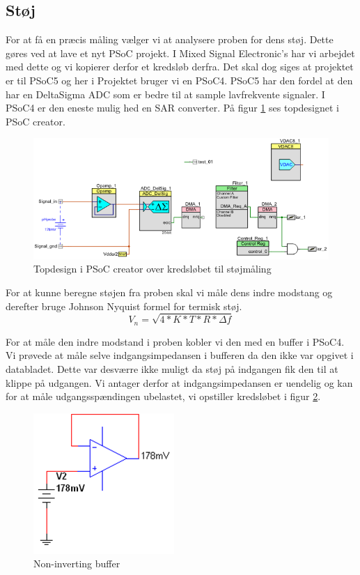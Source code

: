  

\subsection{Støj}

For at få en præcis måling vælger vi at analysere proben for dens støj. Dette gøres ved at lave et nyt PSoC projekt. I Mixed Signal Electronic's har vi arbejdet med dette og vi kopierer derfor et kredsløb derfra. Det skal dog siges at projektet er til PSoC5 og her i Projektet bruger vi en PSoC4. PSoC5 har den fordel at den har en DeltaSigma ADC som er bedre til at sample lavfrekvente signaler. I PSoC4 er den eneste mulig hed en SAR converter. På figur \ref{photo:Topdesign_stoj} ses topdesignet i PSoC creator. 
 \begin{figure}[H]
	\centering 
	\includegraphics[scale=0.8]{HardwareArkitektur/Sensore/pH_probe_billeder/Topdesign_stoj.png}
	\caption{Topdesign i PSoC creator over kredsløbet til støjmåling}
	\label{photo:Topdesign_stoj}
\end{figure} 

For at kunne beregne støjen fra proben skal vi måle dens indre modstang og derefter bruge Johnson Nyquist formel for termisk støj. 
$$ V_n = \sqrt{4*K*T*R*\Delta f} $$

For at måle den indre modstand i proben kobler vi den med en buffer i PSoC4. Vi prøvede at måle selve indgangsimpedansen i bufferen da den ikke var opgivet i databladet. Dette var desværre ikke muligt da støj på indgangen fik den til at klippe på udgangen. Vi antager derfor at indgangsimpedansen er uendelig og kan for at måle udgangsspændingen ubelastet, vi opstiller kredsløbet i figur \ref{photo:Non_inv_buf}. 

 \begin{figure}[H]
	\centering 
	\includegraphics[scale=1]{HardwareArkitektur/Sensore/pH_probe_billeder/Non_inverting_buffer.png}
	\caption{Non-inverting buffer}
	\label{photo:Non_inv_buf}
\end{figure} 


